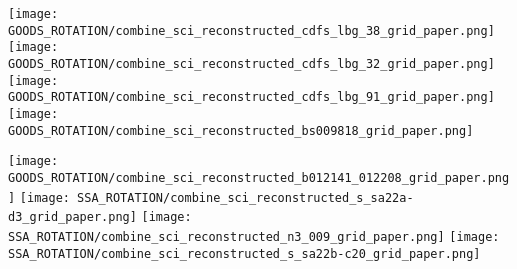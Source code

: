 \documentclass[fleqn,usenatbib]{mn2e}
\begin{document}
\begin{figure*}\ContinuedFloat
    \centering

    \texttt{[image: GOODS\_ROTATION/combine\_sci\_reconstructed\_cdfs\_lbg\_38\_grid\_paper.png]}
    \texttt{[image: GOODS\_ROTATION/combine\_sci\_reconstructed\_cdfs\_lbg\_32\_grid\_paper.png]}
    \texttt{[image: GOODS\_ROTATION/combine\_sci\_reconstructed\_cdfs\_lbg\_91\_grid\_paper.png]}
    \texttt{[image: GOODS\_ROTATION/combine\_sci\_reconstructed\_bs009818\_grid\_paper.png]}


\end{figure*}


\begin{figure*}\ContinuedFloat
    \centering

    \texttt{[image: GOODS\_ROTATION/combine\_sci\_reconstructed\_b012141\_012208\_grid\_paper.png]}
    \texttt{[image: SSA\_ROTATION/combine\_sci\_reconstructed\_s\_sa22a-d3\_grid\_paper.png]}
    \texttt{[image: SSA\_ROTATION/combine\_sci\_reconstructed\_n3\_009\_grid\_paper.png]}
    \texttt{[image: SSA\_ROTATION/combine\_sci\_reconstructed\_s\_sa22b-c20\_grid\_paper.png]}


\end{figure*}
\end{document}
